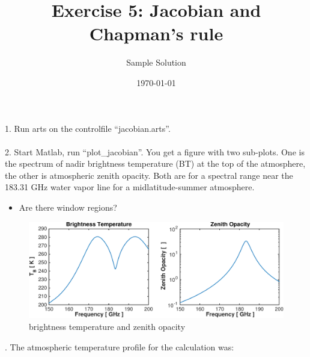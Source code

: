 \documentclass[paper=a4, fontsize=11pt]{scrartcl} %
\title{Exercise 5: Jacobian and Chapman's rule}
\author{Sample Solution}
\date{\normalsize\today}
\begin{document}
\maketitle

1. Run arts on the controlfile ``jacobian.arts''.\ \\
\ \\2. Start Matlab, run ``plot\_jacobian''. You get a figure with two sub-plots. 
One is the spectrum of nadir brightness temperature (BT) at the top of the atmosphere, the other is atmospheric zenith opacity. 
Both are for a spectral range near the 183.31 GHz water vapor line for a midlatitude-summer atmosphere.\ \\

\begin{itemize}
	\item Are there window regions?
\end{itemize}

\begin{figure}[h!]
\centering
 	\includegraphics[width=\textwidth]{plots/bt_op_part1.pdf}
 	\caption{brightness temperature and zenith opacity}
\end{figure}

. The atmospheric temperature profile for the calculation was: \ \\
\end{document}
